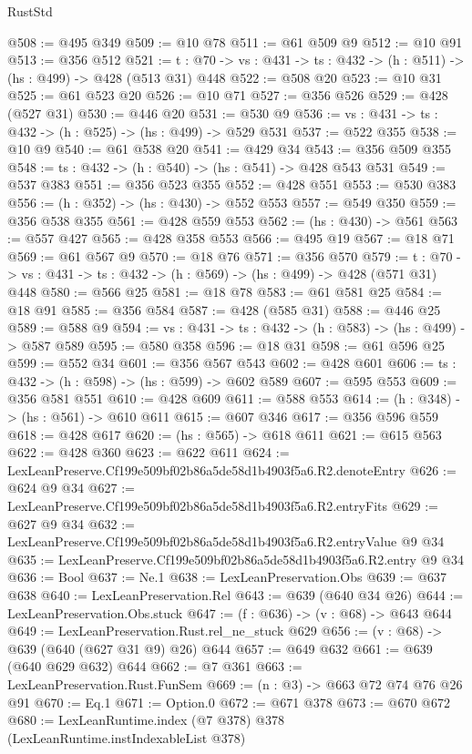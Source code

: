 \begin{lexlean}{RustStd}
\begin{coremodule}
@508 := @495 @349
@509 := @10 @78
@511 := @61 @509 @9
@512 := @10 @91
@513 := @356 @512
@521 := {t : @70} -> {vs : @431} -> {ts : @432} -> (h : @511) -> (hs : @499) -> @428 (@513 @31) @448
@522 := @508 @20
@523 := @10 @31
@525 := @61 @523 @20
@526 := @10 @71
@527 := @356 @526
@529 := @428 (@527 @31)
@530 := @446 @20
@531 := @530 @9
@536 := {vs : @431} -> {ts : @432} -> (h : @525) -> (hs : @499) -> @529 @531
@537 := @522 @355
@538 := @10 @9
@540 := @61 @538 @20
@541 := @429 @34
@543 := @356 @509 @355
@548 := {ts : @432} -> (h : @540) -> (hs : @541) -> @428 @543 @531
@549 := @537 @383
@551 := @356 @523 @355
@552 := @428 @551
@553 := @530 @383
@556 := (h : @352) -> (hs : @430) -> @552 @553
@557 := @549 @350
@559 := @356 @538 @355
@561 := @428 @559 @553
@562 := (hs : @430) -> @561
@563 := @557 @427
@565 := @428 @358 @553
@566 := @495 @19
@567 := @18 @71
@569 := @61 @567 @9
@570 := @18 @76
@571 := @356 @570
@579 := {t : @70} -> {vs : @431} -> {ts : @432} -> (h : @569) -> (hs : @499) -> @428 (@571 @31) @448
@580 := @566 @25
@581 := @18 @78
@583 := @61 @581 @25
@584 := @18 @91
@585 := @356 @584
@587 := @428 (@585 @31)
@588 := @446 @25
@589 := @588 @9
@594 := {vs : @431} -> {ts : @432} -> (h : @583) -> (hs : @499) -> @587 @589
@595 := @580 @358
@596 := @18 @31
@598 := @61 @596 @25
@599 := @552 @34
@601 := @356 @567 @543
@602 := @428 @601
@606 := {ts : @432} -> (h : @598) -> (hs : @599) -> @602 @589
@607 := @595 @553
@609 := @356 @581 @551
@610 := @428 @609
@611 := @588 @553
@614 := (h : @348) -> (hs : @561) -> @610 @611
@615 := @607 @346
@617 := @356 @596 @559
@618 := @428 @617
@620 := (hs : @565) -> @618 @611
@621 := @615 @563
@622 := @428 @360
@623 := @622 @611
@624 := LexLeanPreserve.Cf199e509bf02b86a5de58d1b4903f5a6.R2.denoteEntry
@626 := @624 @9 @34
@627 := LexLeanPreserve.Cf199e509bf02b86a5de58d1b4903f5a6.R2.entryFits
@629 := @627 @9 @34
@632 := LexLeanPreserve.Cf199e509bf02b86a5de58d1b4903f5a6.R2.entryValue @9 @34
@635 := LexLeanPreserve.Cf199e509bf02b86a5de58d1b4903f5a6.R2.entry @9 @34
@636 := Bool
@637 := Ne.{1}
@638 := LexLeanPreservation.Obs
@639 := @637 @638
@640 := LexLeanPreservation.Rel
@643 := @639 (@640 @34 @26)
@644 := LexLeanPreservation.Obs.stuck
@647 := (f : @636) -> (v : @68) -> @643 @644
@649 := LexLeanPreservation.Rust.rel_ne_stuck @629
@656 := (v : @68) -> @639 (@640 (@627 @31 @9) @26) @644
@657 := @649 @632
@661 := @639 (@640 @629 @632) @644
@662 := @7 @361
@663 := LexLeanPreservation.Rust.FunSem
@669 := (n : @3) -> @663 @72 @74 @76 @26 @91
@670 := Eq.{1}
@671 := Option.{0}
@672 := @671 @378
@673 := @670 @672
@680 := LexLeanRuntime.index (@7 @378) @378 (LexLeanRuntime.instIndexableList @378)

\end{coremodule}
\end{lexlean}
